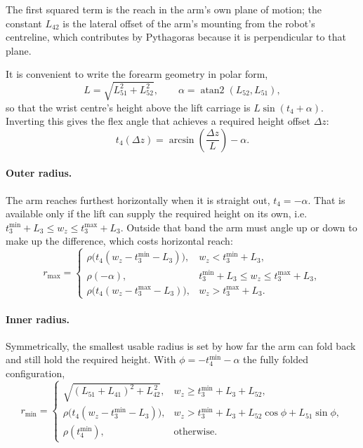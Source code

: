 \documentclass[11pt,a4paper]{article}
\begin{document}
The first squared term is the reach in the arm's own plane of motion; the
constant $L_{42}$ is the lateral offset of the arm's mounting from the robot's
centreline, which contributes by Pythagoras because it is perpendicular to that
plane.

It is convenient to write the forearm geometry in polar form,
\begin{equation}
L = \sqrt{L_{51}^2 + L_{52}^2}, \qquad \alpha = \operatorname{atan2}(L_{52}, L_{51}),
\end{equation}
so that the wrist centre's height above the lift carriage is $L\sin(t_4 + \alpha)$.
Inverting this gives the flex angle that achieves a required height offset
$\Delta z$:
\begin{equation}
t_4(\Delta z) = \arcsin\!\left(\frac{\Delta z}{L}\right) - \alpha .
\end{equation}

\paragraph{Outer radius.} The arm reaches furthest horizontally when it is
straight out, $t_4 = -\alpha$. That is available only if the lift can supply the
required height on its own, i.e.\ $t_3^{\min} + L_3 \le w_z \le t_3^{\max} + L_3$.
Outside that band the arm must angle up or down to make up the difference, which
costs horizontal reach:
\begin{equation}
r_{\max} =
\begin{cases}
\rho\big(t_4(w_z - t_3^{\min} - L_3)\big), & w_z < t_3^{\min} + L_3,\\[4pt]
\rho(-\alpha), & t_3^{\min} + L_3 \le w_z \le t_3^{\max} + L_3,\\[4pt]
\rho\big(t_4(w_z - t_3^{\max} - L_3)\big), & w_z > t_3^{\max} + L_3 .
\end{cases}
\end{equation}

\paragraph{Inner radius.} Symmetrically, the smallest usable radius is set by how
far the arm can fold back and still hold the required height. With
$\phi = -t_4^{\min} - \alpha$ the fully folded configuration,
\begin{equation}
r_{\min} =
\begin{cases}
\sqrt{(L_{51} + L_{41})^2 + L_{42}^{\,2}}, & w_z \ge t_3^{\min} + L_3 + L_{52},\\[4pt]
\rho\big(t_4(w_z - t_3^{\min} - L_3)\big), & w_z > t_3^{\min} + L_3 + L_{52}\cos\phi + L_{51}\sin\phi,\\[4pt]
\rho(t_4^{\min}), & \text{otherwise.}
\end{cases}
\end{equation}
\end{document}
